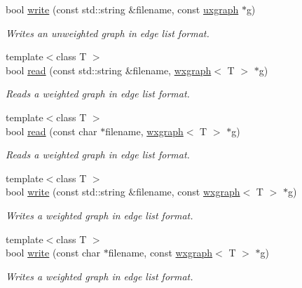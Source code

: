 \begin{DoxyCompactItemize}
bool \hyperlink{namespacelgraph_1_1io_1_1edge__list_a769bbfbae588e800a54d5920ebf6f4d0}{write} (const std\+::string \&filename, const \hyperlink{classlgraph_1_1uxgraph}{uxgraph} $\ast$g)
\begin{DoxyCompactList}\small\item\em Writes an unweighted graph in edge list format. \end{DoxyCompactList}\item 
{\footnotesize template$<$class T $>$ }\\bool \hyperlink{namespacelgraph_1_1io_1_1edge__list_ab421e520957c993c352796a839e38173}{read} (const std\+::string \&filename, \hyperlink{classlgraph_1_1wxgraph}{wxgraph}$<$ T $>$ $\ast$g)
\begin{DoxyCompactList}\small\item\em Reads a weighted graph in edge list format. \end{DoxyCompactList}\item 
{\footnotesize template$<$class T $>$ }\\bool \hyperlink{namespacelgraph_1_1io_1_1edge__list_af10b33e98f0f7df9dd555006a69ad0de}{read} (const char $\ast$filename, \hyperlink{classlgraph_1_1wxgraph}{wxgraph}$<$ T $>$ $\ast$g)
\begin{DoxyCompactList}\small\item\em Reads a weighted graph in edge list format. \end{DoxyCompactList}\item 
{\footnotesize template$<$class T $>$ }\\bool \hyperlink{namespacelgraph_1_1io_1_1edge__list_ae422e4d5062831a958585527065208e7}{write} (const std\+::string \&filename, const \hyperlink{classlgraph_1_1wxgraph}{wxgraph}$<$ T $>$ $\ast$g)
\begin{DoxyCompactList}\small\item\em Writes a weighted graph in edge list format. \end{DoxyCompactList}\item 
{\footnotesize template$<$class T $>$ }\\bool \hyperlink{namespacelgraph_1_1io_1_1edge__list_ab8a0f64a5850e4c9741fcb2fc53646b7}{write} (const char $\ast$filename, const \hyperlink{classlgraph_1_1wxgraph}{wxgraph}$<$ T $>$ $\ast$g)
\begin{DoxyCompactList}\small\item\em Writes a weighted graph in edge list format. \end{DoxyCompactList}\end{DoxyCompactItemize}


